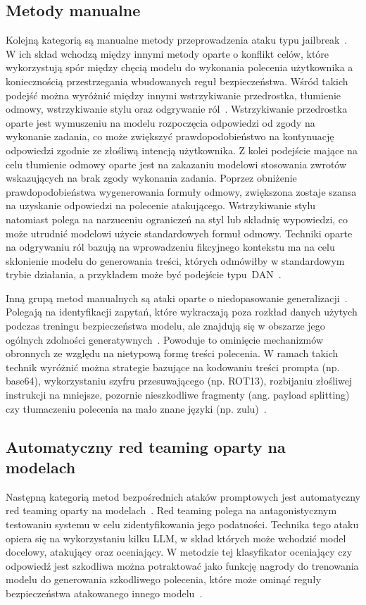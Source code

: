 \subsection{Metody manualne}
Kolejną kategorią są manualne metody przeprowadzenia ataku typu jailbreak~\cite{nist_taxonomy_2025}. W ich skład wchodzą między innymi metody oparte o konflikt celów, które wykorzystują spór między chęcią modelu do wykonania polecenia użytkownika a koniecznością przestrzegania wbudowanych reguł bezpieczeństwa. Wśród takich podejść można wyróżnić między innymi wstrzykiwanie przedrostka, tłumienie odmowy, wstrzykiwanie stylu oraz odgrywanie ról~\cite{wei2023jailbrokendoesllmsafety}.
Wstrzykiwanie przedrostka oparte jest wymuszeniu na modelu rozpoczęcia odpowiedzi od zgody na wykonanie zadania, co może zwiększyć prawdopodobieństwo na kontynuację odpowiedzi zgodnie ze złośliwą intencją użytkownika.
Z kolei podejście mające na celu tłumienie odmowy oparte jest na zakazaniu modelowi stosowania zwrotów wskazujących na brak zgody wykonania zadania. Poprzez obniżenie prawdopodobieństwa wygenerowania formuły odmowy, zwiększona zostaje szansa na uzyskanie odpowiedzi na polecenie atakującego.
Wstrzykiwanie stylu natomiast polega na narzuceniu ograniczeń na styl lub składnię wypowiedzi, co może utrudnić modelowi użycie standardowych formuł odmowy.
Techniki oparte na odgrywaniu ról bazują na wprowadzeniu fikcyjnego kontekstu ma na celu skłonienie modelu do generowania treści, których odmówiłby w standardowym trybie działania, a przykładem może być podejście typu~\gls{DAN}~\cite{choi2025dan}.

Inną grupą metod manualnych są ataki oparte o niedopasowanie generalizacji~\cite{nist_taxonomy_2025}. Polegają na identyfikacji zapytań, które wykraczają poza rozkład danych użytych podczas treningu bezpieczeństwa modelu, ale znajdują się w obszarze jego ogólnych zdolności generatywnych~\cite{wei2023jailbrokendoesllmsafety}. Powoduje to ominięcie mechanizmów obronnych ze względu na nietypową formę treści polecenia.
W ramach takich technik wyróżnić można strategie bazujące na kodowaniu treści prompta (np. base64), wykorzystaniu szyfru przesuwającego (np. ROT13), rozbijaniu złośliwej instrukcji na mniejsze, pozornie nieszkodliwe fragmenty (ang. payload splitting) czy tłumaczeniu polecenia na mało znane języki (np. zulu)~\cite{wei2023jailbrokendoesllmsafety, yong2024lowresourcelanguagesjailbreakgpt4, yuan2024gpt4smartsafestealthy}.

\subsection{Automatyczny red teaming oparty na modelach}
Następną kategorią metod bezpośrednich ataków promptowych jest automatyczny red teaming oparty na modelach~\cite{nist_taxonomy_2025}. Red teaming polega na antagonistycznym testowaniu systemu w celu zidentyfikowania jego podatności. Technika tego ataku opiera się na wykorzystaniu kilku LLM, w skład których może wchodzić model docelowy, atakujący oraz oceniający.
W metodzie tej klasyfikator oceniający czy odpowiedź jest szkodliwa można potraktować jako funkcję nagrody do trenowania modelu do generowania szkodliwego polecenia, które może ominąć reguły bezpieczeństwa atakowanego innego modelu~\cite{nist_taxonomy_2025}.

